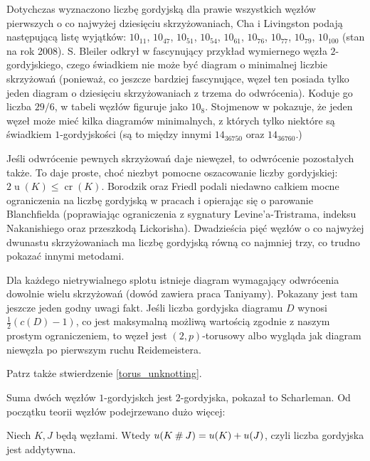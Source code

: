 Dotychczas wyznaczono liczbę gordyjską dla prawie wszystkich węzłów pierwszych o co najwyżej dziesięciu skrzyżowaniach,
Cha i Livingston podają następującą listę wyjątków:
$10_{11}$, $10_{47}$, $10_{51}$, $10_{54}$, $10_{61}$, $10_{76}$, $10_{77}$, $10_{79}$, $10_{100}$ (stan na rok 2008).
S. Bleiler odkrył w \cite{bleiler84} fascynujący przykład wymiernego węzła $2$-gordyjskiego,
czego świadkiem nie może być diagram o minimalnej liczbie skrzyżowań
(ponieważ, co jeszcze bardziej fascynujące, węzeł ten posiada tylko jeden diagram o dziesięciu skrzyżowaniach z trzema do odwrócenia).
Koduje go liczba $29/6$, w tabeli węzłów figuruje jako $10_8$.
Stojmenow w \cite{stoimenow01} pokazuje, że jeden węzeł może mieć kilka diagramów minimalnych,
z których tylko niektóre są świadkiem $1$-gordyjskości (są to między innymi $14_{36750}$ oraz $14_{36760}$.)

Jeśli odwrócenie pewnych skrzyżowań daje niewęzeł, to odwrócenie pozostałych także.
To daje proste, choć niezbyt pomocne oszacowanie liczby gordyjskiej: $2 \operatorname{u} (K) \le \operatorname{cr} (K)$.
Borodzik oraz Friedl podali niedawno całkiem mocne ograniczenia na liczbę gordyjską w pracach \cite{borodzik14} i \cite{borodzik15} opierając się o parowanie Blanchfielda
(poprawiając ograniczenia z sygnatury Levine'a-Tristrama, indeksu Nakanishiego oraz przeszkodą Lickorisha).
Dwadzieścia pięć węzłów o co najwyżej dwunastu skrzyżowaniach ma liczbę gordyjską równą co najmniej trzy, co trudno pokazać innymi metodami.

Dla każdego nietrywialnego splotu istnieje diagram wymagający odwrócenia  dowolnie wielu skrzyżowań (dowód zawiera praca \cite{taniyama09} Taniyamy).
Pokazany jest tam jeszcze jeden godny uwagi fakt.
Jeśli liczba gordyjska diagramu $D$ wynosi $\frac 12 (c(D) - 1)$,
co jest maksymalną możliwą wartością zgodnie z naszym prostym ograniczeniem,
to węzeł jest $(2,p)$-torusowy albo wygląda jak diagram niewęzła po pierwszym ruchu Reidemeistera.

Patrz także stwierdzenie \ref{torus_unknotting}.

Suma dwóch węzłów $1$-gordyjskch jest $2$-gordyjska, pokazał to Scharleman.
Od początku teorii węzłów podejrzewano dużo więcej:

\begin{conjecture}
    Niech $K, J$ będą węzłami.
    Wtedy $u(K \mathbin{\#} J) = u(K) + u(J)$, czyli liczba gordyjska jest addytywna.
\end{conjecture}

